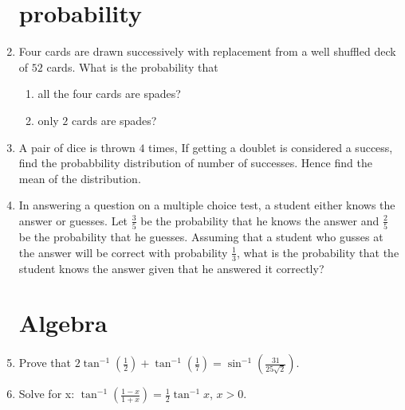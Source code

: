 \documentclass[10pt,-letter paper]{article}
\providecommand{\brak}[1]{\ensuremath{\left(#1\right)}}
\begin{document}
\begin{enumerate}
\section{probability}
\item Four cards are drawn successively with replacement from a well shuffled deck of $52$ cards. What is the probability that
\begin{enumerate}
\item all the four cards are spades?
\item only $2$ cards are spades?
\end{enumerate}
\item A pair of dice is thrown $4$ times, If getting a doublet is considered a success, find the probabbility distribution of number of successes. Hence find the mean of the distribution. \\
\item In answering a question on a multiple choice test, a student either knows the answer or guesses. Let $\frac{3}{5}$ be the probability that he knows the answer and $\frac{2}{5}$ be the probability that he guesses. Assuming that a student who gusses at the answer will be correct with probability $\frac{1}{3}$, what is the probability that the student knows the answer given that he answered it correctly?\\
\section{Algebra}
\item Prove that $2\tan^{-1}\brak{\frac{1}{2}}+\tan^{-1}\brak{\frac{1}{7}} = \sin^{-1}\brak{\frac{31}{25\sqrt{2}}}$. \\
\item Solve for x: $\tan^{-1}\brak{\frac{1-x}{1+x}} = \frac{1}{2}\tan^{-1}x$, $x>0$. \\

\end{enumerate}
\end{document}
